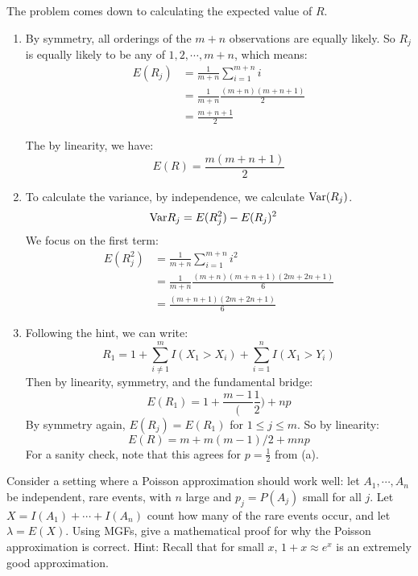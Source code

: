 \documentclass[11pt]{article}
\begin{document}
\begin{solution}
The problem comes down to calculating the expected value of $R$.
\begin{enumerate}
\item By symmetry, all orderings of the $m+n$ observations are equally likely. So $R_j$ is equally likely to be any of $1,2, \cdots, m+n$, which means:
\begin{align*}
E(R_j) &= \frac{1}{m+n} \sum_{i=1}^{m+n} i\\
&= \frac{1}{m+n}\frac{(m+n)(m+n + 1)}{2}\\ &= \frac{m+n+1}{2}
\end{align*}

The by linearity, we have:
$$
E(R) = \frac{m(m+n+1)}{2}
$$
\item To calculate the variance, by independence, we calculate $\textrm{Var}(R_j)$.
\begin{align*}
\textrm{Var}{R_j} &= E(R_j^2) - E(R_j)^2
\end{align*}
We focus on the first term:
\begin{align*}
E(R_j^2) &= \frac{1}{m+n}\sum_{i=1}^{m+n} i^2 \\
&= \frac{1}{m+n}\frac{(m+n)(m+n+1)(2m + 2n + 1)}{6} \\
&= \frac{(m+n+1)(2m + 2n + 1)}{6}
\end{align*}
\item Following the hint, we can write:
$$
R_1 = 1 + \sum_{i \neq 1}^m I(X_1 > X_i) + \sum_{i=1}^n I(X_1 > Y_i)
$$
Then by linearity, symmetry, and the fundamental bridge:
$$
E(R_1) = 1 + \frac{m-1}(\frac{1}{2}) + np
$$
By symmetry again, $E(R_j) = E(R_1)$ for $1 \leq j \leq m$. So by linearity:
$$
E(R) = m + m(m-1)/2 + mnp
$$
For a sanity check, note that this agrees for $p = \frac{1}{2}$ from (a).
\end{enumerate}
\end{solution}

\begin{exercise}
Consider a setting where a Poisson approximation should work well: let $A_1 ,\cdots , A_n$ be independent, rare events, with $n$ large and $p_j = P(A_j)$ small for all $j$. Let $X = I(A_1) + \cdots + I(A_n)$ count how many of the rare events occur, and let $\lambda = E(X)$. Using MGFs, give a mathematical proof for why the Poisson approximation is correct.
Hint: Recall that for small $x$, $1 + x \approx e^x$ is an extremely good approximation.
\end{exercise}
\end{document}
